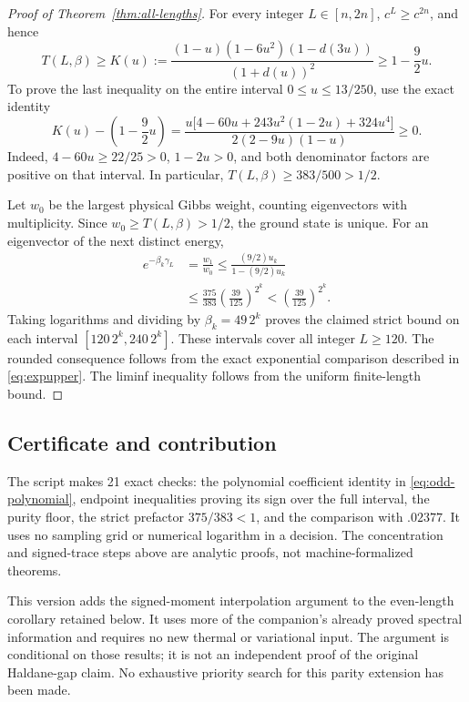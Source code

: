 \documentclass[11pt,a4paper]{article}
\newcommand{\gap}{\gamma}
\begin{document}
\begin{proof}[Proof of Theorem~\ref{thm:all-lengths}]
For every integer $L\in[n,2n]$, $c^L\ge c^{2n}$, and hence
\begin{equation}\label{eq:odd-K}
 T(L,\beta)\ge K(u):=
 \frac{(1-u)(1-6u^2)(1-d(3u))}{(1+d(u))^2}
 \ge1-\frac92u.
\end{equation}
To prove the last inequality on the entire interval $0\le u\le13/250$,
use the exact identity
\begin{equation}\label{eq:odd-polynomial}
 K(u)-\left(1-\frac92u\right)=
 \frac{u\bigl[4-60u+243u^2(1-2u)+324u^4\bigr]}
      {2(2-9u)(1-u)}\ge0.
\end{equation}
Indeed, $4-60u\ge22/25>0$, $1-2u>0$, and both denominator factors
are positive on that interval. In particular,
$T(L,\beta)\ge383/500>1/2$.

Let $w_0$ be the largest physical Gibbs weight, counting eigenvectors
with multiplicity. Since $w_0\ge T(L,\beta)>1/2$, the ground state is
unique. For an eigenvector of the next distinct energy,
\begin{align*}
 e^{-\beta_k\gap_L}
 &=\frac{w_1}{w_0}
 \le\frac{(9/2)u_k}{1-(9/2)u_k}\\
 &\le\frac{375}{383}\left(\frac{39}{125}\right)^{2^k}
 <\left(\frac{39}{125}\right)^{2^k}.
\end{align*}
Taking logarithms and dividing by $\beta_k=49\,2^k$ proves the claimed
strict bound on each interval $[120\,2^k,240\,2^k]$. These intervals
cover all integer $L\ge120$. The rounded consequence follows from the
exact exponential comparison described in \eqref{eq:expupper}.
The liminf inequality follows from the uniform finite-length bound.
\end{proof}

\subsection{Certificate and contribution}
The script  makes 21 exact checks:
the polynomial coefficient identity in \eqref{eq:odd-polynomial},
endpoint inequalities proving its sign over the full interval, the
purity floor, the strict prefactor $375/383<1$, and the comparison with
$.02377$. It uses no sampling grid or numerical logarithm in a decision.
The concentration and signed-trace steps above are analytic proofs,
not machine-formalized theorems.

This version adds the signed-moment interpolation argument to the
even-length corollary retained below. It uses more of the companion's
already proved spectral information and requires no new thermal or
variational input. The argument is conditional on those results;
it is not an independent proof of the original Haldane-gap claim.
No exhaustive priority search for this parity extension has been made.
\end{document}
